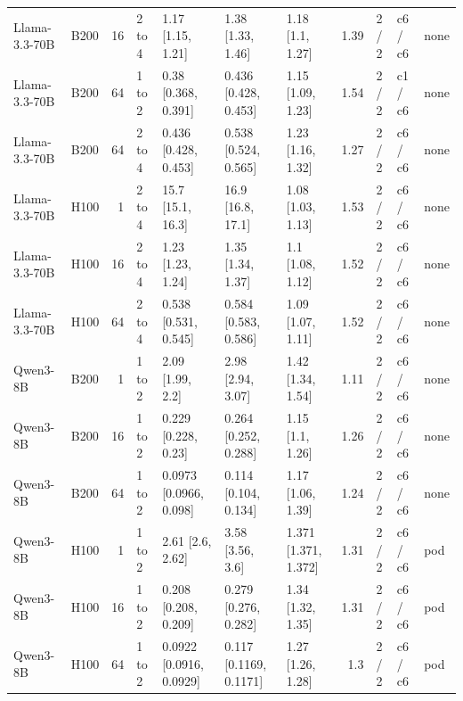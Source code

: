 \begin{landscape}
\begin{longtable}{llrllllrlll}
Llama-3.3-70B & B200 & 16 & 2 to 4 & 1.17 {[}1.15, 1.21{]} & 1.38 {[}1.33, 1.46{]} & 1.18 {[}1.1, 1.27{]} & 1.39 & 2 / 2 & c6 / c6 & none \\
Llama-3.3-70B & B200 & 64 & 1 to 2 & 0.38 {[}0.368, 0.391{]} & 0.436 {[}0.428, 0.453{]} & 1.15 {[}1.09, 1.23{]} & 1.54 & 2 / 2 & c1 / c6 & none \\
Llama-3.3-70B & B200 & 64 & 2 to 4 & 0.436 {[}0.428, 0.453{]} & 0.538 {[}0.524, 0.565{]} & 1.23 {[}1.16, 1.32{]} & 1.27 & 2 / 2 & c6 / c6 & none \\
Llama-3.3-70B & H100 & 1 & 2 to 4 & 15.7 {[}15.1, 16.3{]} & 16.9 {[}16.8, 17.1{]} & 1.08 {[}1.03, 1.13{]} & 1.53 & 2 / 2 & c6 / c6 & none \\
Llama-3.3-70B & H100 & 16 & 2 to 4 & 1.23 {[}1.23, 1.24{]} & 1.35 {[}1.34, 1.37{]} & 1.1 {[}1.08, 1.12{]} & 1.52 & 2 / 2 & c6 / c6 & none \\
Llama-3.3-70B & H100 & 64 & 2 to 4 & 0.538 {[}0.531, 0.545{]} & 0.584 {[}0.583, 0.586{]} & 1.09 {[}1.07, 1.11{]} & 1.52 & 2 / 2 & c6 / c6 & none \\
Qwen3-8B & B200 & 1 & 1 to 2 & 2.09 {[}1.99, 2.2{]} & 2.98 {[}2.94, 3.07{]} & 1.42 {[}1.34, 1.54{]} & 1.11 & 2 / 2 & c6 / c6 & none \\
Qwen3-8B & B200 & 16 & 1 to 2 & 0.229 {[}0.228, 0.23{]} & 0.264 {[}0.252, 0.288{]} & 1.15 {[}1.1, 1.26{]} & 1.26 & 2 / 2 & c6 / c6 & none \\
Qwen3-8B & B200 & 64 & 1 to 2 & 0.0973 {[}0.0966, 0.098{]} & 0.114 {[}0.104, 0.134{]} & 1.17 {[}1.06, 1.39{]} & 1.24 & 2 / 2 & c6 / c6 & none \\
Qwen3-8B & H100 & 1 & 1 to 2 & 2.61 {[}2.6, 2.62{]} & 3.58 {[}3.56, 3.6{]} & 1.371 {[}1.371, 1.372{]} & 1.31 & 2 / 2 & c6 / c6 & pod \\
Qwen3-8B & H100 & 16 & 1 to 2 & 0.208 {[}0.208, 0.209{]} & 0.279 {[}0.276, 0.282{]} & 1.34 {[}1.32, 1.35{]} & 1.31 & 2 / 2 & c6 / c6 & pod \\
Qwen3-8B & H100 & 64 & 1 to 2 & 0.0922 {[}0.0916, 0.0929{]} & 0.117 {[}0.1169, 0.1171{]} & 1.27 {[}1.26, 1.28{]} & 1.3 & 2 / 2 & c6 / c6 & pod \\
\end{longtable}
\endgroup
\end{landscape}
\restoregeometry
